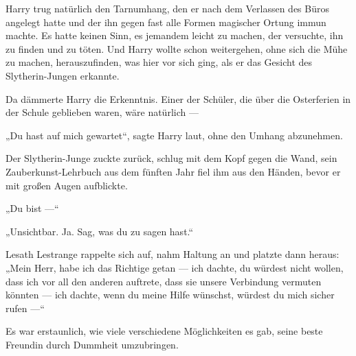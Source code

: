Harry trug natürlich den Tarnumhang, den er nach dem Verlassen des Büros angelegt hatte und der ihn gegen fast alle Formen magischer Ortung immun machte. Es hatte keinen Sinn, es jemandem leicht zu machen, der versuchte, ihn zu finden und zu töten. Und Harry wollte schon weitergehen, ohne sich die Mühe zu machen, herauszufinden, was hier vor sich ging, als er das Gesicht des Slytherin-Jungen erkannte.

Da dämmerte Harry die Erkenntnis. Einer der Schüler, die über die Osterferien in der Schule geblieben waren, wäre natürlich —

„Du hast auf mich gewartet“, sagte Harry laut, ohne den Umhang abzunehmen.

Der Slytherin-Junge zuckte zurück, schlug mit dem Kopf gegen die Wand, sein Zauberkunst-Lehrbuch aus dem fünften Jahr fiel ihm aus den Händen, bevor er mit großen Augen aufblickte.

„Du bist —“

„Unsichtbar. Ja. Sag, was du zu sagen hast.“

Lesath Lestrange rappelte sich auf, nahm Haltung an und platzte dann heraus:
„Mein Herr, habe ich das Richtige getan — ich dachte, du würdest nicht wollen, dass ich vor all den anderen auftrete, dass sie unsere Verbindung vermuten könnten — ich dachte, wenn du meine Hilfe wünschst, würdest du mich sicher rufen —“

Es war erstaunlich, wie viele verschiedene Möglichkeiten es gab, seine beste Freundin durch Dummheit umzubringen.

